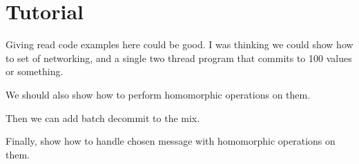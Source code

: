 \section{Tutorial}

Giving read code examples here could be good. I was thinking we could show how to set of networking, and a single two thread program that commits to 100 values or something.

We should also show how to perform homomorphic operations on them.

Then we can add batch decommit to the mix.

Finally, show how to handle chosen message with homomorphic operations on them.